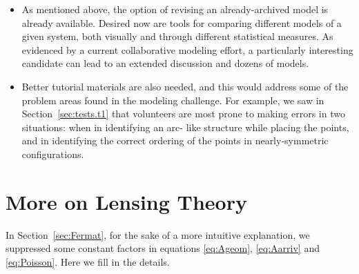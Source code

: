\documentclass[12pt,preprint]{aastex}
\newcommand{\secref}[1]{Section~\ref{sec:#1}}
\begin{document}
\begin{itemize}
\item As mentioned above, the option of revising an already-archived
  model is already available.  Desired now are tools for comparing
  different models of a given system, both visually and through
  different statistical measures.  As evidenced by a current
  collaborative modeling effort, a particularly interesting candidate
  can lead to an extended discussion and dozens of models.
\item Better tutorial materials are also needed, and this would
  address some of the problem areas found in the modeling challenge.
  For example, we saw in \secref{tests.t1} that volunteers are most
  prone to making errors in two situations: when in identifying an arc-
  like structure while placing the points, and in identifying the
  correct ordering of the points in nearly-symmetric configurations.
\end{itemize}

\clearpage

\appendix

\section{More on Lensing Theory} \label{sec:more-theory}

In \secref{Fermat}, for the sake of a more intuitive
explanation, we suppressed some constant factors in
equations \eqref{eq:Ageom}, \eqref{eq:Aarriv} and \eqref{eq:Poisson}.
Here we fill in the details.
\end{document}
